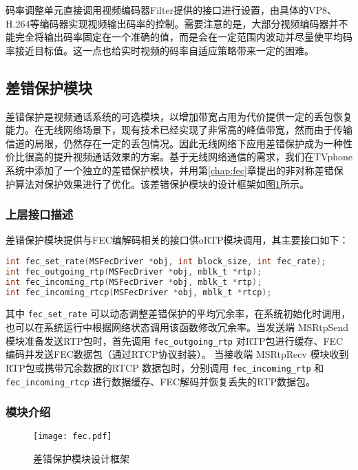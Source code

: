     码率调整单元直接调用视频编码器Filter提供的接口进行设置，由具体的VP8、H.264等编码器实现视频输出码率的控制。需要注意的是，大部分视频编码器并不能完全将输出码率固定在一个准确的值，而是会在一定范围内波动并尽量使平均码率接近目标值。这一点也给实时视频的码率自适应策略带来一定的困难。


\subsection{差错保护模块}
差错保护是视频通话系统的可选模块，以增加带宽占用为代价提供一定的丢包恢复能力。在无线网络场景下，现有技术已经实现了非常高的峰值带宽，然而由于传输信道的局限，仍然存在一定的丢包情况。因此无线网络下应用差错保护成为一种性价比很高的提升视频通话效果的方案。基于无线网络通信的需求，我们在TVphone系统中添加了一个独立的差错保护模块，并用第\ref{chap:fec}章提出的非对称差错保护算法对保护效果进行了优化。该差错保护模块的设计框架如图\ref{fig:fec_arch}所示。

    \subsubsection{上层接口描述}
    差错保护模块提供与FEC编解码相关的接口供oRTP模块调用，其主要接口如下：
    \begin{lstlisting}[language=C]
int fec_set_rate(MSFecDriver *obj, int block_size, int fec_rate);
int fec_outgoing_rtp(MSFecDriver *obj, mblk_t *rtp);
int fec_incoming_rtp(MSFecDriver *obj, mblk_t *rtp);
int fec_incoming_rtcp(MSFecDriver *obj, mblk_t *rtcp);
    \end{lstlisting}
    
    其中 \lstinline!fec_set_rate! 可以动态调整差错保护的平均冗余率，在系统初始化时调用，也可以在系统运行中根据网络状态调用该函数修改冗余率。当发送端 MSRtpSend 模块准备发送RTP包时，首先调用 \lstinline!fec_outgoing_rtp! 对RTP包进行缓存、FEC编码并发送FEC数据包（通过RTCP协议封装）。 当接收端 MSRtpRecv 模块收到RTP包或携带冗余数据的RTCP 数据包时，分别调用 \lstinline!fec_incoming_rtp! 和 \lstinline!fec_incoming_rtcp! 进行数据缓存、FEC解码并恢复丢失的RTP数据包。

    \subsubsection{模块介绍}
    \begin{figure}[htbp]
      \centering
      \texttt{[image: fec.pdf]}
      \caption{差错保护模块设计框架}
      \label{fig:fec_arch}
    \end{figure}

